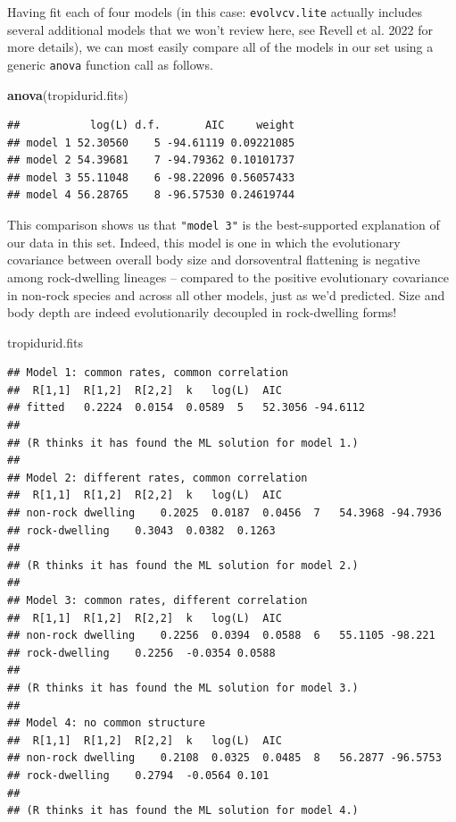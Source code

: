 \documentclass[fleqn,10pt,lineno]{wlpeerj} %
\newenvironment{Shaded}{\begin{snugshade}}{\end{snugshade}}
\newcommand{\FunctionTok}[1]{\textcolor[rgb]{0.13,0.29,0.53}{\textbf{#1}}}
\newcommand{\NormalTok}[1]{#1}
\begin{document}
Having fit each of four models (in this case: \texttt{evolvcv.lite} actually includes several additional models that we won't review here, see Revell et al. 2022 for more details), we can most easily compare all of the models in our set using a generic \texttt{anova} function call as follows.

\begin{Shaded}
\begin{Highlighting}[]
\FunctionTok{anova}\NormalTok{(tropidurid.fits)}
\end{Highlighting}
\end{Shaded}

\begin{verbatim}
##           log(L) d.f.       AIC     weight
## model 1 52.30560    5 -94.61119 0.09221085
## model 2 54.39681    7 -94.79362 0.10101737
## model 3 55.11048    6 -98.22096 0.56057433
## model 4 56.28765    8 -96.57530 0.24619744
\end{verbatim}

This comparison shows us that \texttt{"model\ 3"} is the best-supported explanation of our data in this set. Indeed, this model is one in which the evolutionary covariance between overall body size and dorsoventral flattening is negative among rock-dwelling lineages -- compared to the positive evolutionary covariance in non-rock species and across all other models, just as we'd predicted. Size and body depth are indeed evolutionarily decoupled in rock-dwelling forms!

\begin{Shaded}
\begin{Highlighting}[]
\NormalTok{tropidurid.fits}
\end{Highlighting}
\end{Shaded}

\begin{verbatim}
## Model 1: common rates, common correlation 
##  R[1,1]  R[1,2]  R[2,2]  k   log(L)  AIC
## fitted   0.2224  0.0154  0.0589  5   52.3056 -94.6112    
## 
## (R thinks it has found the ML solution for model 1.)
## 
## Model 2: different rates, common correlation
##  R[1,1]  R[1,2]  R[2,2]  k   log(L)  AIC
## non-rock dwelling    0.2025  0.0187  0.0456  7   54.3968 -94.7936    
## rock-dwelling    0.3043  0.0382  0.1263  
## 
## (R thinks it has found the ML solution for model 2.)
## 
## Model 3: common rates, different correlation
##  R[1,1]  R[1,2]  R[2,2]  k   log(L)  AIC
## non-rock dwelling    0.2256  0.0394  0.0588  6   55.1105 -98.221 
## rock-dwelling    0.2256  -0.0354 0.0588  
## 
## (R thinks it has found the ML solution for model 3.)
## 
## Model 4: no common structure
##  R[1,1]  R[1,2]  R[2,2]  k   log(L)  AIC
## non-rock dwelling    0.2108  0.0325  0.0485  8   56.2877 -96.5753    
## rock-dwelling    0.2794  -0.0564 0.101   
## 
## (R thinks it has found the ML solution for model 4.)
\end{verbatim}
\end{document}

